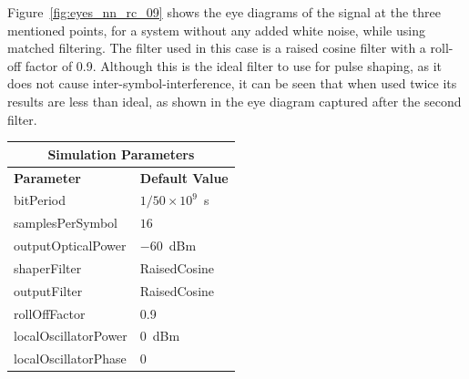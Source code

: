 \begin{refsection}
Figure~\ref{fig:eyes_nn_rc_09} shows the eye diagrams of the signal at the
three mentioned points, for a system without any added white noise, while using
matched filtering. The filter used in this case is a raised cosine filter with
a roll-off factor of 0.9. Although this is the ideal filter to use for pulse
shaping, as it does not cause inter-symbol-interference, it can be seen that
when used twice its results are less than ideal, as shown in the eye diagram
captured after the second filter.
\begin{table}[H]
	\centering
	\footnotesize
	\begin{tabular}{|l|l|}
		\hline
		\multicolumn{2}{|c|}{ \textbf{Simulation Parameters} } \\
		\hline
		\textbf{Parameter}     & \textbf{Default Value}                                     \\\hline
		bitPeriod              & $1/50\times10^9$~s														\\\hline
		samplesPerSymbol       & $16$                                                       \\\hline
		outputOpticalPower     & $-60$~dBm 													\\ \hline
		shaperFilter	       & RaisedCosine												\\ \hline
		outputFilter		   & RaisedCosine												\\ \hline
		rollOffFactor		   & 0.9														\\ \hline
				localOscillatorPower   & $0$~dBm                                                    \\ \hline
				localOscillatorPhase   & $0$                                                        \\ \hline

\end{tabular}
\end{table}
\end{refsection}
